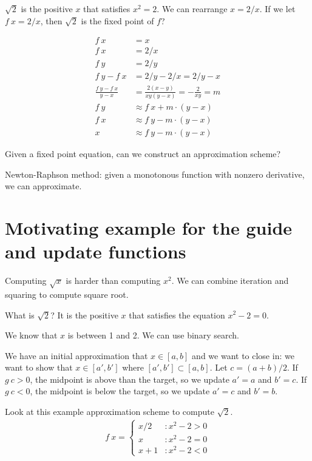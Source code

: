 \(\sqrt{2}\) is the positive \(x\) that satisfies \(x^2 = 2\).
We can rearrange \(x = 2/x\). If we let \(f~x = 2/x\), then \(\sqrt{2}\) is the fixed point of \(f\)?

\begin{align*}
    f~x &= x
    \\
    f~x &= 2/x
    \\
    f~y &= 2/y
    \\
    f~y - f~x &= 2/y - 2/x = 2/y - x
    \\
    \frac{f~y - f~x}{y - x} &= \frac{2(x-y)}{xy(y-x)} = - \frac{2}{xy} = m
    \\
    f~y &\approx f~x + m \cdot (y - x)
    \\
    f~x &\approx f~y - m \cdot (y - x)
    \\
    x &\approx f~y - m \cdot (y - x)
\end{align*}

Given a fixed point equation, can we construct an approximation scheme?

Newton-Raphson method: given a monotonous function with nonzero derivative, we can approximate.

\section{Motivating example for the guide and update functions}

Computing \(\sqrt{x}\) is harder than computing \(x^2\).
We can combine iteration and squaring to compute square root.

What is \(\sqrt{2}\)? It is the positive \(x\) that satisfies the equation \(x^2 - 2 = 0\).

We know that \(x\) is between 1 and 2.
We can use binary search.

We have an initial approximation that \(x \in [a,b]\) and we want to close in:
we want to show that \(x \in [a',b']\) where \([a',b'] \subset [a,b]\).
Let \(c = (a+b)/2\). If \(g~c > 0\), the midpoint is above than the target,
so we update \(a' = a\) and \(b' = c\).
If \(g~c < 0\), the midpoint is below the target,
so we update \(a' = c\) and \(b' = b\).

Look at this example approximation scheme to compute \(\sqrt{2}\).
\begin{align*}
    f~x = \begin{cases}
        x / 2 &: x^2 - 2 > 0
        \\
        x &: x^2 - 2 = 0
        \\
        x + 1 &: x^2 - 2 < 0
    \end{cases}
\end{align*}

